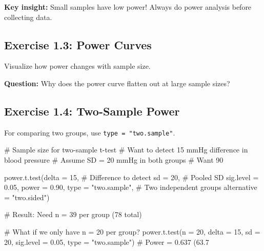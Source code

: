 \documentclass[11pt]{article}
\begin{document}
\textbf{Key insight:} Small samples have low power! Always do power analysis before collecting data.

\vspace{1cm}

\subsection{Exercise 1.3: Power Curves}

Visualize how power changes with sample size.


\textbf{Question:} Why does the power curve flatten out at large sample sizes?

\vspace{1.5cm}

\subsection{Exercise 1.4: Two-Sample Power}

For comparing two groups, use \texttt{type = "two.sample"}.

\begin{rcode}
# Sample size for two-sample t-test
# Want to detect 15 mmHg difference in blood pressure
# Assume SD = 20 mmHg in both groups
# Want 90%

power.t.test(delta = 15,          # Difference to detect
             sd = 20,              # Pooled SD
             sig.level = 0.05,
             power = 0.90,
             type = "two.sample",  # Two independent groups
             alternative = "two.sided")

# Result: Need n = 39 per group (78 total)

# What if we only have n = 20 per group?
power.t.test(n = 20, delta = 15, sd = 20,
             sig.level = 0.05, type = "two.sample")
# Power = 0.637 (63.7%
\end{rcode}
\end{document}
